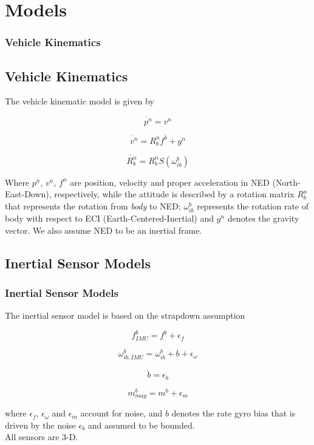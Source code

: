 \documentclass{beamer}
\begin{document}
\section{Models}

	\begin{frame}
	\frametitle{Vehicle Kinematics}
	\subsection{Vehicle Kinematics}
	The vehicle kinematic model is given by
	
	\[ \dot{p^n} = v^n \]
	
	\[ \dot{v^n} = R^n_b f^b + g^n\]
	
	\[ \dot{R^n_b} = R^n_bS(\omega^b_{ib}) \]
	
	Where $p^n$, $v^n$, $f^n$ are position, velocity and proper 
	acceleration in NED (North-East-Down), respectively, while the 
	attitude is described by a rotation matrix $R^n_b$ that
	represents the rotation from \textit{body} to NED; $\omega^b_{ib}$
	represents the rotation rate of body with respect to ECI 
	(Earth-Centered-Inertial) and $g^n$ denotes the gravity vector.
	We also assume NED to be an inertial frame. 
	\end{frame}
    \subsection{Inertial Sensor Models}
	\begin{frame}
	\frametitle{Inertial Sensor Models}

	The inertial sensor model is based on the strapdown assumption
	
	\[ f^b_{IMU} = f^b + \epsilon_f\]
	
	\[ \omega^b_{ib,IMU} = \omega^b_{ib} + b + \epsilon_\omega \]
	
	\[ \dot{b} = \epsilon_b \]
	
	\[ m^b_{mag} = m^b + \epsilon_m \]
	
	where $\epsilon_f$, $\epsilon_\omega$ and $\epsilon_m$ account for noise, and $b$ denotes the rate gyro bias that is driven by the noise $\epsilon_b$ and assumed to be bounded.  
	\\ All sensors are 3-D.
	\end{frame}
\end{document}
